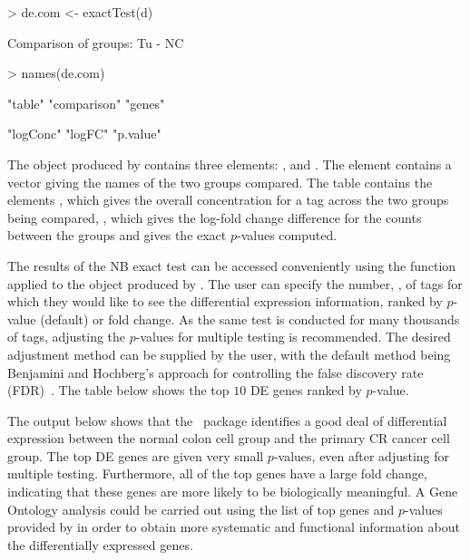 \begin{Schunk}
\begin{Sinput}
> de.com <- exactTest(d)
\end{Sinput}
\begin{Soutput}
Comparison of groups:  Tu - NC 
\end{Soutput}
\begin{Sinput}
> names(de.com)
\end{Sinput}
\begin{Soutput}
[1] "table"      "comparison" "genes"     
\end{Soutput}
\begin{Soutput}
[1] "logConc" "logFC"   "p.value"
\end{Soutput}
\end{Schunk}

The object produced by  contains three elements:
,  and . The element
 contains a vector giving the names of the
two groups compared. The table contains the
elements , which gives the overall concentration for a
tag across the two groups being compared, , which gives
the log-fold change difference for the counts between the groups and
 gives the exact $p$-values computed.

The results of the NB exact test can be accessed conveniently using
the  function applied to the object produced by
. The user can specify the number, , of tags
for which they would like to see the differential expression
information, ranked by $p$-value (default) or fold change. As the same
test is conducted for many thousands of tags, adjusting the $p$-values
for multiple testing is recommended. The desired adjustment method can
be supplied by the user, with the default method being Benjamini and
Hochberg's approach for controlling the false discovery rate
(FDR)~\citep{Benjamini95}. The table below shows the top $10$ DE genes
ranked by $p$-value.

The output below shows that the \edgeR~package identifies a good deal
of differential expression between the normal colon cell group and the
primary CR cancer cell group. The top DE genes are given very small
$p$-values, even after adjusting for multiple testing. Furthermore,
all of the top genes have a large fold change, indicating that these
genes are more likely to be biologically meaningful. A Gene Ontology
analysis could be carried out using the list of top genes and
$p$-values provided by  in order to obtain more
systematic and functional information about the differentially
expressed genes.

